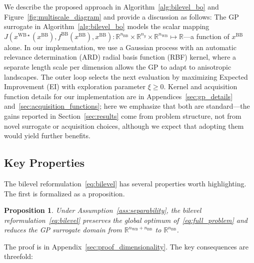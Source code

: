 \documentclass[12pt,a4paper]{article}%
\theoremstyle{plain}%
\newtheorem{proposition}[theorem]{Proposition}%
\theoremstyle{remark}%
\theoremstyle{definition}%
\def\WB{\mathrm{WB}}
\def\BB{\mathrm{BB}}
\begin{document}
We describe the proposed approach in Algorithm~\ref{alg:bilevel_bo} and Figure~\ref{fig:multiscale_diagram} and provide a discussion as follows: The GP surrogate in Algorithm~\ref{alg:bilevel_bo} models the scalar mapping $J(x^{\WB\star}(x^{\BB}), f^{\BB}(x^{\BB}), x^{\BB}):\mathbb{R}^{n_\BB} \times \mathbb{R}^{n_y} \times \mathbb{R}^{n_\WB} \mapsto \mathbb{R}$---a function of $x^{\BB}$ alone. In our implementation, we use a Gaussian process with an automatic relevance determination (ARD) radial basis function (RBF) kernel, where a separate length scale per dimension allows the GP to adapt to anisotropic landscapes. The outer loop selects the next evaluation by maximizing Expected Improvement (EI) with exploration parameter $\xi \geq 0$. Kernel and acquisition function details for our implementation are in Appendices~\ref{sec:gp_details} and~\ref{sec:acquisition_functions}; here we emphasize that both are standard---the gains reported in Section~\ref{sec:results} come from problem structure, not from novel surrogate or acquisition choices, although we expect that adopting them would yield further benefits.

\subsection{Key Properties}\label{subsec:key_properties}

The bilevel reformulation~\eqref{eq:bilevel} has several properties worth highlighting. The first is formalized as a proposition.

\begin{proposition}\label{prop:dimensionality}
Under Assumption~\ref{ass:separability}, the bilevel reformulation~\eqref{eq:bilevel} preserves the global optimum of~\eqref{eq:full_problem} and reduces the GP surrogate domain from $\mathbb{R}^{n_{\WB}+n_{\BB}}$ to $\mathbb{R}^{n_{\BB}}$.
\end{proposition}

\noindent The proof is in Appendix~\ref{sec:proof_dimensionality}. The key consequences are threefold:
\end{document}

